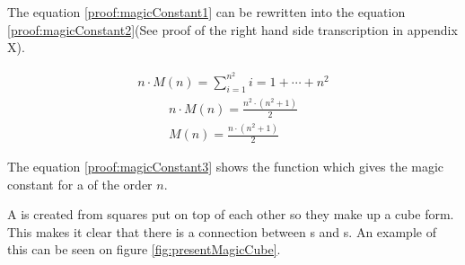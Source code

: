 The equation \ref{proof:magicConstant1} can be rewritten into the equation \ref{proof:magicConstant2}(See proof of the right hand side transcription in appendix X).

\begin{align}
\label{proof:magicConstant1}
	n \cdot M \left( n \right) = \sum ^{n^2}_{i = 1} i = 1 + \cdots + n^2
\end{align}
\begin{align}
\label{proof:magicConstant2}
	n \cdot M \left( n \right) = \frac{n^2 \cdot \left( n^2 + 1 \right)}{2} \\
\label{proof:magicConstant3}
	M \left( n \right) = \frac{n \cdot \left( n^2 + 1 \right)}{2} 
\end{align}

The equation \ref{proof:magicConstant3} shows the function which gives the magic constant for a \msquare{} of the order $n$.


A \mcube{} is created from squares put on top of each other so they make up a cube form. 
This makes it clear that there is a connection between \msquare{}s and  \mcube{}s.
An example of this can be seen on figure \ref{fig:presentMagicCube}.